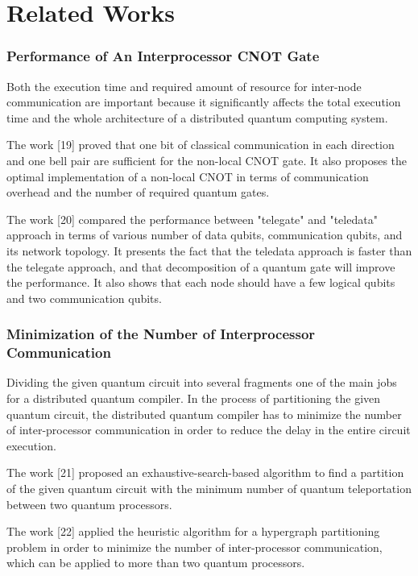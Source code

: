 \chapter{Related Works}
\label{related works}

\subsection{Performance of  An Interprocessor CNOT Gate}
Both the execution time and required amount of resource for inter-node communication are important because it significantly affects the total execution time and the whole architecture of a distributed quantum computing system. 

 The work [19] proved that one bit of classical communication in each direction and one bell pair are sufficient for the non-local CNOT gate.  It also proposes the optimal implementation of a non-local CNOT in terms of communication overhead and the number of required quantum gates. 
 
 The work [20] compared the performance between "telegate" and "teledata" approach in terms of various number of data qubits, communication qubits, and its network topology.  It presents the fact that the teledata approach is faster than the telegate approach, and that decomposition of a quantum gate will improve the performance.  It also shows that each node should have a few logical qubits and two communication qubits.

\subsection{Minimization of the Number of Interprocessor Communication}

Dividing the given quantum circuit into several fragments one of the main jobs for a distributed quantum compiler.  In the process of partitioning the given quantum circuit, the distributed quantum compiler has to minimize the number of inter-processor communication in order to reduce the delay in the entire circuit execution.  

The work [21] proposed an exhaustive-search-based algorithm to find a partition of the given quantum circuit with the minimum number of quantum teleportation between two quantum processors.

The work [22] applied the heuristic algorithm for a hypergraph partitioning problem in order to minimize the number of inter-processor communication, which can be applied to more than two quantum processors.

